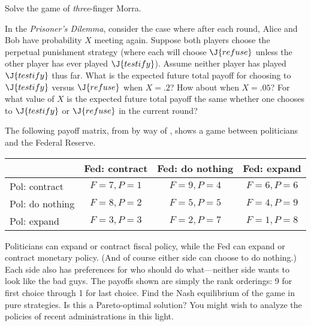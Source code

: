 \begin{iexercise}
Solve the game of {\em three}-finger Morra.
\end{iexercise} 

\begin{iexercise}
In the {\em Prisoner's Dilemma}, consider
the case where after each round, Alice and Bob have probability \(X\)
meeting again.  Suppose both players choose the perpetual punishment
strategy (where each will choose \(\J{refuse}\) unless the other player has
ever played \(\J{testify}\)).  Assume neither player has played \(\J{testify}\) thus
far.  What is the expected future total payoff for choosing to \(\J{testify}\)
versus \(\J{refuse}\) when \(X = .2\)?  How about when \(X = .05\)?  For what value of
\(X\) is the expected future total payoff the same whether one chooses to
\(\J{testify}\) or \(\J{refuse}\) in the current round?
\end{iexercise} 

\begin{uexercise}
The following payoff matrix, from  by way of
, shows a game between politicians and the
Federal Reserve. 
\medskip
\begin{center}
\begin{tabular}{|l|c|c|c|}
\hline
    & Fed: contract & Fed: do nothing & Fed: expand \\
\hline
Pol: contract & \(F=7, P=1\) & \(F=9,P=4\) & \(F=6,P=6\) \\ 
\hline
Pol: do nothing  & \(F=8, P=2\) & \(F=5,P=5\) & \(F=4,P=9\) \\
\hline
Pol: expand   & \(F=3, P=3\) & \(F=2,P=7\) & \(F=1,P=8\) \\
\hline
\end{tabular}
\end{center}
\medskip
Politicians can expand or contract fiscal policy, while the Fed can
expand or contract monetary policy.  (And of course either side can
choose to do nothing.) Each side also has preferences for who should do
what---neither side wants to look like the bad guys.  The payoffs
shown are simply the rank orderings: 9 for first choice through 1
for last choice.  Find the Nash equilibrium of the game in pure
strategies.  Is this a Pareto-optimal solution? You might wish to
analyze the policies of recent administrations in this light.
\end{uexercise} 


